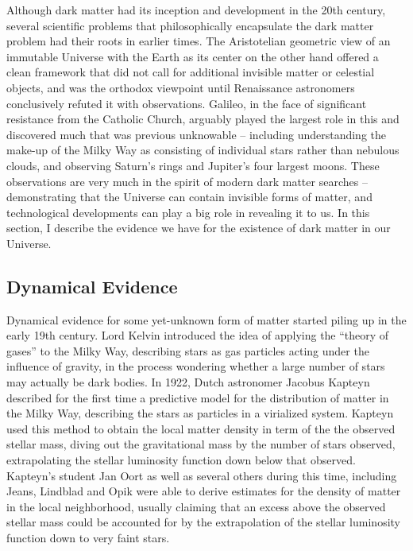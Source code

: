 Although dark matter had its inception and development in the 20th century, several scientific problems that philosophically encapsulate the dark matter problem had their roots in earlier times. 
The Aristotelian geometric view of an immutable Universe with the Earth as its center on the other hand offered a clean framework that did not call for additional invisible matter or celestial objects, and was the orthodox viewpoint until Renaissance astronomers conclusively refuted it with observations. Galileo, in the face of significant resistance from the Catholic Church, arguably played the largest role in this and discovered much that was previous unknowable -- including understanding the make-up of the Milky Way as consisting of individual stars rather than nebulous clouds, and observing Saturn's rings and Jupiter's four largest moons. These observations are very much in the spirit of modern dark matter searches -- demonstrating that the Universe can contain invisible forms of matter, and technological developments can play a big role in revealing it to us. In this section, I describe the evidence we have for the existence of dark matter in our Universe.


\subsection{Dynamical Evidence}


Dynamical evidence for some yet-unknown form of matter started piling up in the early 19th century. Lord Kelvin introduced the idea of applying the ``theory of gases'' to the Milky Way, describing stars as gas particles acting under the influence of gravity, in the process wondering whether a large number of stars may actually be dark bodies. In 1922, Dutch astronomer Jacobus Kapteyn described for the first time a predictive model for the distribution of matter in the Milky Way, describing the stars as particles in a virialized system. Kapteyn used this method to obtain the local matter density in term of the the observed stellar mass, diving out the gravitational mass by the number of stars observed, extrapolating the stellar luminosity function down below that observed. Kapteyn's student Jan Oort as well as several others during this time, including Jeans, Lindblad and Opik were able to derive estimates for the density of matter in the local neighborhood, usually claiming that an excess above the observed stellar mass could be accounted for by the extrapolation of the stellar luminosity function down to very faint stars.

